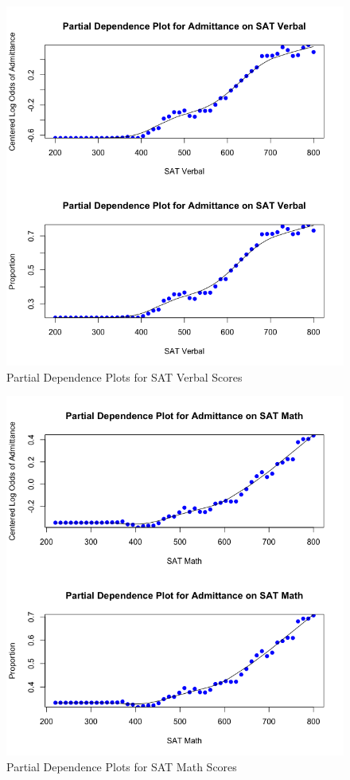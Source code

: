 \documentclass[titlepage]{article}   	%
\begin{document}
\begin{figure} [h]
\centering
\includegraphics[scale=.60]{DEPENDENCE3}
\caption{Partial Dependence Plots for SAT Verbal Scores}
\end{figure}

\begin{figure} [h]
\centering
\includegraphics[scale=.60]{DEPENDENCE4}
\caption{Partial Dependence Plots for SAT Math Scores}
\end{figure}
\end{document}
